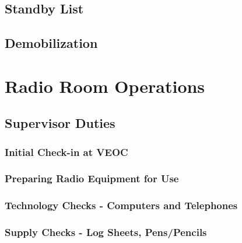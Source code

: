 \documentclass[pdflatex,letterpaper,twoside,12pt]{book}
\begin{document}

\section{Standby List}


\section{Demobilization}


\chapter{Radio Room Operations}

\section{Supervisor Duties}

\subsection{Initial Check-in at VEOC}

\subsection{Preparing Radio Equipment for Use}

\subsection{Technology Checks - Computers and Telephones}

\subsection{Supply Checks - Log Sheets, Pens/Pencils}
\end{document}
